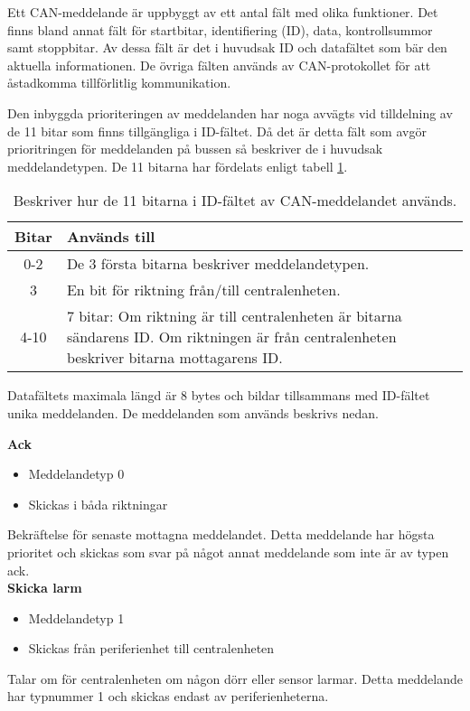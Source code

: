 Ett CAN-meddelande är uppbyggt av ett antal fält med olika funktioner. Det finns bland annat fält för startbitar, identifiering (ID), data, kontrollsummor samt stoppbitar. Av dessa fält är det i huvudsak ID och datafältet som bär den aktuella informationen.
De övriga fälten används av CAN-protokollet för att åstadkomma tillförlitlig kommunikation.

Den inbyggda prioriteringen av meddelanden har noga avvägts vid tilldelning av de 11 bitar som finns tillgängliga i ID-fältet.
Då det är detta fält som avgör prioritringen för meddelanden på bussen så beskriver de i huvudsak meddelandetypen.
De 11 bitarna har fördelats enligt tabell \ref{tab:idbitar}.

\begin{table}[H]
	\centering
	\begin{tabular}{|c|p{}|}
		\hline
		Bitar 	& Används till \\ \hline \hline
		0-2		& De 3 första bitarna beskriver meddelandetypen. \\ \hline
		3		& En bit för riktning från/till centralenheten. \\ \hline
		4-10	& 7 bitar:
		Om riktning är till centralenheten är bitarna sändarens ID.
		Om riktningen är från centralenheten beskriver bitarna mottagarens ID. \\ \hline

	\end{tabular}
	\caption{Beskriver hur de 11 bitarna i ID-fältet av CAN-meddelandet används.}
	\label{tab:idbitar}
\end{table}


Datafältets maximala längd är 8 bytes och bildar tillsammans med ID-fältet unika meddelanden. De meddelanden som används beskrivs nedan.



\textbf{Ack}
\begin{itemize}
    \item Meddelandetyp 0
    \item Skickas i båda riktningar
\end{itemize}
Bekräftelse för senaste mottagna meddelandet. Detta meddelande har högsta prioritet och skickas som svar på något annat meddelande som inte är av typen ack. \\


\textbf{Skicka larm}
\begin{itemize}
    \item Meddelandetyp 1
    \item Skickas från periferienhet till centralenheten
\end{itemize}
Talar om för centralenheten om någon dörr eller sensor larmar. Detta meddelande har typnummer 1 och skickas endast av periferienheterna. \\


